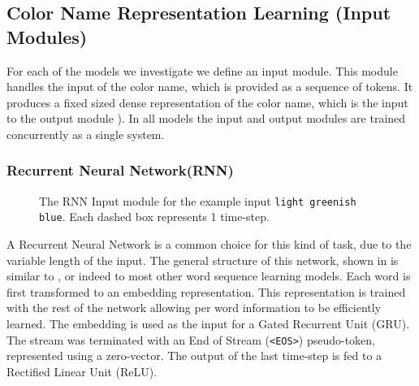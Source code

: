 \documentclass[]{clv3}
\newcommand{\textcite}{\citet}
\newcommand{\natlang}[1]{\texttt{#1}}
\begin{document}
\subsection{Color Name Representation Learning (Input Modules)}\label{sec:inputmod}
For each of the models we investigate we define an input module.
This module handles the input of the color name, which is provided as a sequence of tokens.
It produces a fixed sized dense representation of the color name,
which is the input to the output module ).
In all models the input and output modules are trained concurrently as a single system.

\subsubsection{Recurrent Neural Network(RNN)}\label{sec:rnnmod}
\begin{figure}
	
	\caption{The RNN Input module for the example input \natlang{light greenish blue}. Each dashed box represents 1 time-step. \label{fig:rnnmod}}
\end{figure}


A Recurrent Neural Network is a common choice for this kind of task,
due to the variable length of the input.
The general structure of this network, shown in  is similar to \textcite{2016arXiv160603821M}, or indeed to most other word sequence learning models.
Each word is first transformed to an embedding representation.
This representation is trained with the rest of the network allowing per word information to be efficiently learned.
The embedding is used as the input for a Gated Recurrent Unit (GRU).
The stream was terminated with an End of Stream (\natlang{<EOS>}) pseudo-token,
represented using a zero-vector.
The output of the last time-step is fed to a Rectified Linear Unit (ReLU).
\end{document}
